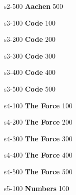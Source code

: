 \documentclass{beamer}
\def \secondcat {\textbf{Aachen}}
\def \thirdcat {\textbf{Code}}
\def \fourthcat {\textbf{The Force}}
\def \fifthcat {\textbf{Numbers}}
\begin{document}
	
	\content                       
	{s2-500}                     
	{\secondcat}                          
	{500}{   
		
	}
	
	
	\content                       
	{s3-100}                     
	{\thirdcat}                          
	{100}{    
		
	}
	
	
	\content                       
	{s3-200}                     
	{\thirdcat}                          
	{200}{     
		
	}
	
	
	\content           
	{s3-300}                     
	{\thirdcat}                          
	{300}{    
		
	}
	
	
	\content                       
	{s3-400}                     
	{\thirdcat}                          
	{400}{     
		
	}
	
	
	\content                       
	{s3-500}                     
	{\thirdcat}                          
	{500}{  
		
	}
	
	
	\content                       
	{s4-100}                     
	{\fourthcat}                          
	{100}{    
		
	}
	
	
	\content                       
	{s4-200}                     
	{\fourthcat}                          
	{200}{        
		
	}
	
	
	\content           
	{s4-300}                     
	{\fourthcat}                          
	{300}{    
		
	}
	
	
	\content                       
	{s4-400}                     
	{\fourthcat}                          
	{400}{    
		
	}
	
	
	\content                       
	{s4-500}                     
	{\fourthcat}                          
	{500}{    
		
	}
	
	
	\content                       
	{s5-100}                     
	{\fifthcat}                          
	{100}{ 
		
	}
	
\end{document}
